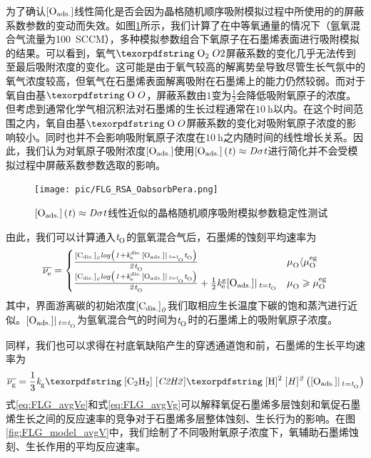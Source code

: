为了确认$\rm{\left[O_{ads.}\right]} \it$线性简化是否会因为晶格随机顺序吸附模拟过程中所使用的的屏蔽系数参数的变动而失效。如图\ref{fig:FLG_RSA_OabsorbPera}所示，我们计算了在中等氧通量的情况下（氩氧混合气流量为\SI{100}{SCCM}），多种模拟参数组合下氧原子在石墨烯表面进行吸附模拟的结果。可以看到，氧气$\cemb{O2}$屏蔽系数的变化几乎无法传到至最后吸附浓度的变化。这可能是由于氧气较高的解离势垒导致尽管生长气氛中的氧气浓度较高，但氧气在石墨烯表面解离吸附在石墨烯上的能力仍然较弱。而对于氧自由基$\cemb{O}$，屏蔽系数由$1$变为$\frac{1}{2}$会降低吸附氧原子的浓度。但考虑到通常化学气相沉积法对石墨烯的生长过程通常在$\SI{10}{\hour}$以内。在这个时间范围之内，氧自由基$\cemb{O}$屏蔽系数的变化对吸附氧原子浓度的影响较小。同时也并不会影响吸附氧原子浓度在$\SI{10}{\hour}$之内随时间的线性增长关系。因此，我们认为对氧原子吸附浓度$\rm{\left[O_{ads.}\right]} \it$使用$\rm{\left[O_{ads.}\right]} \it\left(\it t\right)\approx \it D \sigma t$进行简化并不会受模拟过程中屏蔽系数参数选取的影响。

\begin{figure}[htb]
    \texttt{[image: pic/FLG\_RSA\_OabsorbPera.png]}
    \caption{$\rm{\left[O_{ads.}\right]} \it\left(\it t\right)\approx \it D \sigma t$线性近似的晶格随机顺序吸附模拟参数稳定性测试}
    \label{fig:FLG_RSA_OabsorbPera}
\end{figure}

由此，我们可以计算通入$\it{t_{\rm O}^{\rm }} \it$的氩氧混合气后，石墨烯的蚀刻平均速率为\chinesecolon
\begin{equation}
    \label{eq:FLG_avgVe}
    \overline{\it \nu_{\rm e}^{\rm } \it}=
    \begin{cases}
        \frac{\rm{\left[C_{dis.}\right]} \it_0 log\left( 1+\it{k_{\rm e}^{\rm dis.}} \it\rm{\left[O_{ads.}\right]} \it | \,_{t=\it{t_{\rm O}^{\rm }} \it} \it{t_{\rm O}^{\rm }} \it \right) }{\it 2 \it{t_{\rm O}^{\rm }} \it}                                                        & \it \mu_{\rm O}^{\rm } \it \langle \it \mu_{\rm O}^{\rm eg} \it         \\
        \frac{\rm{\left[C_{dis.}\right]} \it_0 log\left( 1+\it{k_{\rm e}^{\rm dis.}} \it\rm{\left[O_{ads.}\right]} \it | \,_{t=\it{t_{\rm O}^{\rm }} \it} \it{t_{\rm O}^{\rm }} \it \right) }{\it 2 \it{t_{\rm O}^{\rm }} \it} + \frac{1}{2}\it{k_{\rm e}^{\rm g}} \it\rm{\left[O_{ads.}\right]} \it| \,_{t=\it{t_{\rm O}^{\rm }} \it} & \it \mu_{\rm O}^{\rm } \it \geqslant \it \mu_{\rm O}^{\rm eg} \it
    \end{cases}
\end{equation}
其中，界面游离碳的初始浓度$\rm{\left[C_{dis.}\right]} \it_0$我们取相应生长温度下碳的饱和蒸汽进行近似。$\rm{\left[O_{ads.}\right]} \it| \,_{t=\it{t_{\rm O}^{\rm }} \it}$为氩氧混合气的时间为$\it{t_{\rm O}^{\rm }} \it$时的石墨烯上的吸附氧原子浓度。

同样，我们也可以求得在衬底氧缺陷产生的穿透通道饱和前，石墨烯的生长平均速率为\chinesecolon
\begin{equation}
    \label{eq:FLG_avgVg}
    \overline{\RateV{g}{}} =\frac{1}{3}\RateK{g}{}\cemb{[C2H2]}\cemb{[H]^2}\left(\Oads |_{\,\ReactTime{}{}=\ReactTime{O}{}} \right)
\end{equation}
式\ref{eq:FLG_avgVe}和式\ref{eq:FLG_avgVg}可以解释氧促石墨烯多层蚀刻和氧促石墨烯生长之间的反应速率的竞争对于石墨烯多层整体蚀刻、生长行为的影响。在图\ref{fig:FLG_model_avgV}中，我们绘制了不同吸附氧原子浓度下，氧辅助石墨烯蚀刻、生长作用的平均反应速率。

